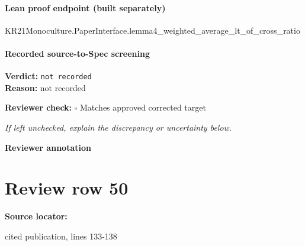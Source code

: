\documentclass[10pt]{article}
\newcommand{\reviewerbox}{%
  \par\noindent\fbox{\parbox{0.96\linewidth}{\rule{0pt}{0.38in}}}\par
}
\newcommand{\reviewmatch}[1]{%
  \par\noindent\textbf{Reviewer check:} $\square$\; #1\par
  \noindent\emph{If left unchecked, explain the discrepancy or uncertainty below.}\par
}
\begin{document}
\paragraph{Lean proof endpoint (built separately)}\begin{ReviewVerbatim}
KR21Monoculture.PaperInterface.lemma4_weighted_average_lt_of_cross_ratio
\end{ReviewVerbatim}

\paragraph{Recorded source-to-Spec screening}
\textbf{Verdict:} \texttt{not recorded}
\\
\textbf{Reason:} not recorded
\reviewmatch{Matches approved corrected target}
\noindent\textbf{Reviewer annotation}\par
\reviewerbox
\clearpage
\hypertarget{source-claim-7e7ac58d3e77e0cc}{}
\section*{Review row 50}
\textbf{Source locator:} {\footnotesize\raggedright cited publication, lines 133-\allowbreak{}138\par}
\end{document}

